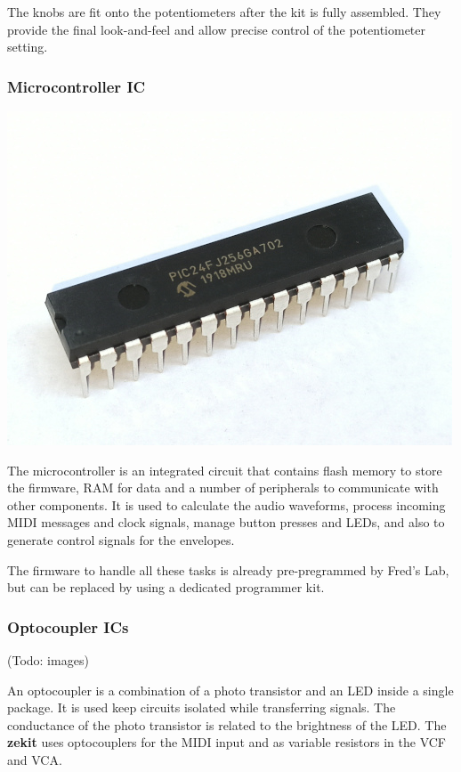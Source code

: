 \documentclass{scrartcl}
\begin{document}
The knobs are fit onto the potentiometers after the kit is fully assembled. They provide the final look-and-feel and allow precise control of the potentiometer setting.

\subsubsection{Microcontroller IC}

\begin{center}
    \includegraphics[scale=0.5]{assets/zekit-mcu-resized.jpg}
\end{center}

The microcontroller is an integrated circuit that contains flash memory to store the firmware, RAM for data and a number of peripherals to communicate with other components. It is used to calculate the audio waveforms, process incoming MIDI messages and clock signals, manage button presses and LEDs, and also to generate control signals for the envelopes.

The firmware to handle all these tasks is already pre-pregrammed by Fred’s Lab, but can be replaced by using a dedicated programmer kit.

\subsubsection{Optocoupler ICs}

\begin{center}
    (Todo: images)
\end{center}

An optocoupler is a combination of a photo transistor and an LED inside a single package. It is used keep circuits isolated while transferring signals. The conductance of the photo transistor is related to the brightness of the LED. The \textbf{zekit} uses optocouplers for the MIDI input and as variable resistors in the VCF and VCA.
\end{document}
